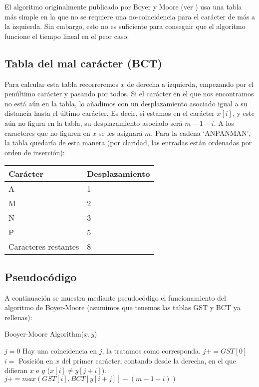 El algoritmo originalmente publicado por Boyer y Moore (ver \cite{articulo1}) usa una tabla más simple en la que no se requiere una no-coincidencia para el carácter de más a la izquierda. Sin embargo, esto no es suficiente para conseguir que el algoritmo funcione el tiempo lineal en el peor caso.

\subsection{Tabla del mal carácter (BCT)}
Para calcular esta tabla recorreremos $x$ de derecha a izquierda, empezando por el penúltimo carácter y pasando por todos. Si el carácter en el que nos encontramos no está aún en la tabla, lo añadimos con un desplazamiento asociado igual a su distancia hasta el último carácter. Es decir, si estamos en el carácter $x[i]$, y este aún no figura en la tabla, su desplazamiento asociado será $m - 1 - i$. A los caracteres que no figuren en $x$ se les asignará $m$. Para la cadena `ANPANMAN', la tabla quedaría de esta manera (por claridad, las entradas están ordenadas por orden de inserción): \\ 
 
\begin{table}[H]
\begin{tabular}{|l|l|}
\hline
\rowcolor[HTML]{EFEFEF} 
\textbf{Carácter}    & \textbf{Desplazamiento} \\ \hline
A                    & 1                       \\ \hline
M                    & 2                       \\ \hline
N                    & 3                       \\ \hline
P                    & 5                       \\ \hline
Caracteres restantes & 8                       \\ \hline
\end{tabular}
\end{table}


\subsection{Pseudocódigo}
A continuación se muestra mediante pseudocódigo el funcionamiento del algoritmo de Boyer-Moore (asumimos que tenemos las tablas GST y BCT ya rellenas): 

\begin{algorithm}[H]
\begin{algorithmic}[1]
\caption{Booyer-Moore Algorithm($x,y$)}
\STATE $j = 0$
\STATE Hay una coincidencia en $j$, la tratamos como corresponda.
\STATE $j += GST[0]$
\ELSE
\STATE $i =$ Posición en $x$ del primer carácter, contando desde la derecha, en el que difieran $x$ e $y$ ($x[i] \neq y[j + i]$).
\STATE $j += max(GST[i], BCT[y[i + j]] - (m - 1 - i))$
\ENDIF
\ENDWHILE
\end{algorithmic}
\end{algorithm}